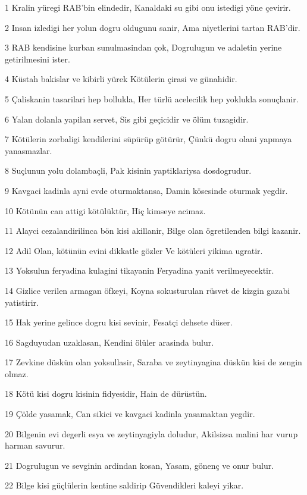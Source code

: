 \par 1 Kralin yüregi RAB'bin elindedir, Kanaldaki su gibi onu istedigi yöne çevirir.
\par 2 Insan izledigi her yolun dogru oldugunu sanir, Ama niyetlerini tartan RAB'dir.
\par 3 RAB kendisine kurban sunulmasindan çok, Dogrulugun ve adaletin yerine getirilmesini ister.
\par 4 Küstah bakislar ve kibirli yürek Kötülerin çirasi ve günahidir.
\par 5 Çaliskanin tasarilari hep bollukla, Her türlü acelecilik hep yoklukla sonuçlanir.
\par 6 Yalan dolanla yapilan servet, Sis gibi geçicidir ve ölüm tuzagidir.
\par 7 Kötülerin zorbaligi kendilerini süpürüp götürür, Çünkü dogru olani yapmaya yanasmazlar.
\par 8 Suçlunun yolu dolambaçli, Pak kisinin yaptiklariysa dosdogrudur.
\par 9 Kavgaci kadinla ayni evde oturmaktansa, Damin kösesinde oturmak yegdir.
\par 10 Kötünün can attigi kötülüktür, Hiç kimseye acimaz.
\par 11 Alayci cezalandirilinca bön kisi akillanir, Bilge olan ögretilenden bilgi kazanir.
\par 12 Adil Olan, kötünün evini dikkatle gözler Ve kötüleri yikima ugratir.
\par 13 Yoksulun feryadina kulagini tikayanin Feryadina yanit verilmeyecektir.
\par 14 Gizlice verilen armagan öfkeyi, Koyna sokusturulan rüsvet de kizgin gazabi yatistirir.
\par 15 Hak yerine gelince dogru kisi sevinir, Fesatçi dehsete düser.
\par 16 Sagduyudan uzaklasan, Kendini ölüler arasinda bulur.
\par 17 Zevkine düskün olan yoksullasir, Saraba ve zeytinyagina düskün kisi de zengin olmaz.
\par 18 Kötü kisi dogru kisinin fidyesidir, Hain de dürüstün.
\par 19 Çölde yasamak, Can sikici ve kavgaci kadinla yasamaktan yegdir.
\par 20 Bilgenin evi degerli esya ve zeytinyagiyla doludur, Akilsizsa malini har vurup harman savurur.
\par 21 Dogrulugun ve sevginin ardindan kosan, Yasam, gönenç ve onur bulur.
\par 22 Bilge kisi güçlülerin kentine saldirip Güvendikleri kaleyi yikar.
